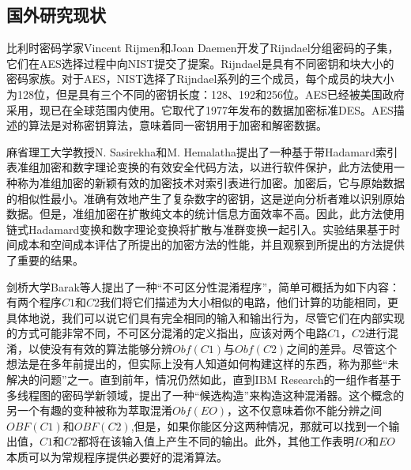 \subsection{国外研究现状}

比利时密码学家Vincent Rijmen和Joan Daemen开发了Rijndael分组密码\cite{段钢2003加密与解密}的子集，它们在AES选择过程中向NIST提交了提案\cite{2020Saturable}。Rijndael是具有不同密钥和块大小的密码家族。对于AES，NIST选择了Rijndael系列的三个成员\cite{0Compile2}，每个成员的块大小为128位，但是具有三个不同的密钥长度：128、192和256位。AES已经被美国政府采用，现已在全球范围内使用\cite{2019Implementation}。它取代了1977年发布的数据加密标准DES。AES描述的算法是对称密钥算法，意味着同一密钥用于加密和解密数据。

麻省理工大学教授N. Sasirekha和M. Hemalatha提出了一种基于带Hadamard索引表准组加密和数字理论变换的有效安全代码方法\cite{2020Bacterial}，以进行软件保护\cite{2020Detecting}，此方法使用一种称为准组加密的新颖有效的加密技术对索引表进行加密。加密后，它与原始数据的相似性最小。准确有效地产生了复杂数字的密钥，这是逆向分析者难以识别原始数据。但是，准组加密在扩散纯文本的统计信息方面效率不高。因此，此方法使用链式Hadamard变换和数字理论变换将扩散与准群变换一起引入。实验结果基于时间成本和空间成本评估了所提出的加密方法的性能，并且观察到所提出的方法提供了重要的结果。



剑桥大学Barak等人提出了一种“不可区分性混淆程序”\cite{Kyu2020Clustering}，简单可概括为如下内容：有两个程序$\mathit{C1}$和$\mathit{C2}$我们将它们描述为大小相似的电路，他们计算的功能相同，更具体地说，我们可以说它们具有完全相同的输入和输出行为，尽管它们在内部实现的方式可能非常不同，不可区分混淆的定义指出，应该对两个电路$\mathit{C1}$，$\mathit{C2}$进行混淆，以使没有有效的算法能够分辨$\mathit{Obf(C1)}$与$\mathit{Obf(C2)}$之间的差异。尽管这个想法是在多年前提出的，但实际上没有人知道如何构建这样的东西，称为那些“未解决的问题”之一。直到前年，情况仍然如此，直到IBM Research的一组作者基于多线程图的密码学新领域，提出了一种“候选构造”来构造这种混淆器\cite{2019White}。这个概念的另一个有趣的变种被称为萃取混淆$\mathit{Obf(EO)}$，这不仅意味着你不能分辨之间$\mathit{OBF(C1)}$和$\mathit{OBF(C2)}$,但是，如果你能区分这两种情况，那就可以找到一个输出值，$\mathit{C1}$和$\mathit{C2}$都将在该输入值上产生不同的输出。此外，其他工作表明$\mathit{IO}$和$\mathit{EO}$本质可以为常规程序提供必要好的混淆算法。

